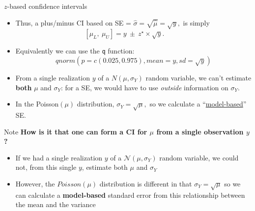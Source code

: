 \documentclass[10pt,handout]{beamer}\usepackage[]{graphicx}\usepackage[]{color}
\begin{document}
\begin{frame}{$z$-based confidence intervals}
	\begin{itemize}
		\setlength\itemsep{1.1em}
		\item Thus, a plus/minus CI based on SE = $\hat{\sigma} =  \sqrt{\hat{\mu}} = \sqrt{y},$   is simply
		$$[ \mu_{L}, \ \mu_{U}] = y  \ \pm \ z^\star \times \sqrt{y}. \ \ \ \ \ \ \ \ \ \ \ \  $$
		\item Equivalently we can use the \texttt{q} function: $$qnorm(p = c(0.025, 0.975), mean = y, sd = \sqrt{y})$$
		
		
		\vspace*{-0.7cm}
		
		\item From a single realization $y$ of a $N(\mu,\sigma_{Y})$ random variable, we can't estimate \textbf{both} $\mu$ and $\sigma_{Y}$: for a SE, we would have to use \textit{outside} information on $\sigma_{Y}$.  
		
		
		
		\item In the  Poisson$(\mu)$ distribution, $\sigma_{Y} = \sqrt{\mu},$ so we  calculate a ``\underline{model-based}'' SE.
		
		
	\end{itemize}
	
\end{frame}


\begin{frame}
\end{frame}



\begin{frame}{Note}
	\textbf{How is it that one can form a CI for $\mu$ from a single observation $y$?}
	\vspace{0.2in}
	\pause
	\begin{itemize}
		\item If we had a single realization $y$ of a $\mathcal{N}(\mu, \sigma_{Y})$ random variable, we could not,
		from this single $y$, estimate both $\mu$ and $\sigma_{Y}$
		\item However, the $Poisson(\mu)$ distribution is different in that $\sigma_{Y} = \sqrt{\mu}$ so we can calculate a \textbf{model-based} standard error from this relationship between the mean and the variance
	\end{itemize}
	
\end{frame}
\end{document}
